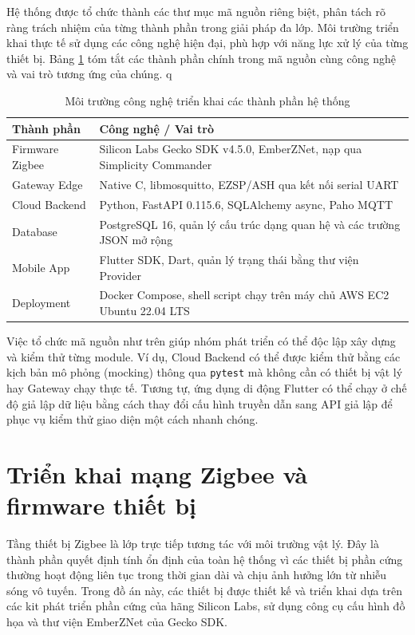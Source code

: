 Hệ thống được tổ chức thành các thư mục mã nguồn riêng biệt, phân tách rõ ràng trách nhiệm của từng thành phần trong giải pháp đa lớp. Môi trường triển khai thực tế sử dụng các công nghệ hiện đại, phù hợp với năng lực xử lý của từng thiết bị. Bảng \ref{tab:ch4-source-map} tóm tắt các thành phần chính trong mã nguồn cùng công nghệ và vai trò tương ứng của chúng.
q
\begin{table}[H]
\centering
\caption{Môi trường công nghệ triển khai các thành phần hệ thống}
\label{tab:ch4-source-map}
{\footnotesize
\begin{tabular}{|p{4.5cm}|p{10.0cm}|}
\hline
\textbf{Thành phần} & \textbf{Công nghệ / Vai trò} \\ \hline
Firmware Zigbee & Silicon Labs Gecko SDK v4.5.0, EmberZNet, nạp qua Simplicity Commander \\ \hline
Gateway Edge & Native C, libmosquitto, EZSP/ASH qua kết nối serial UART \\ \hline
Cloud Backend & Python, FastAPI 0.115.6, SQLAlchemy async, Paho MQTT \\ \hline
Database & PostgreSQL 16, quản lý cấu trúc dạng quan hệ và các trường JSON mở rộng \\ \hline
Mobile App & Flutter SDK, Dart, quản lý trạng thái bằng thư viện Provider \\ \hline
Deployment & Docker Compose, shell script chạy trên máy chủ AWS EC2 Ubuntu 22.04 LTS \\ \hline
\end{tabular}
}
\end{table}

Việc tổ chức mã nguồn như trên giúp nhóm phát triển có thể độc lập xây dựng và kiểm thử từng module. Ví dụ, Cloud Backend có thể được kiểm thử bằng các kịch bản mô phỏng (mocking) thông qua \texttt{pytest} mà không cần có thiết bị vật lý hay Gateway chạy thực tế. Tương tự, ứng dụng di động Flutter có thể chạy ở chế độ giả lập dữ liệu bằng cách thay đổi cấu hình truyền dẫn sang API giả lập để phục vụ kiểm thử giao diện một cách nhanh chóng.

\section{Triển khai mạng Zigbee và firmware thiết bị}
\label{sec:ch4-zigbee-layer}

Tầng thiết bị Zigbee là lớp trực tiếp tương tác với môi trường vật lý. Đây là thành phần quyết định tính ổn định của toàn hệ thống vì các thiết bị phần cứng thường hoạt động liên tục trong thời gian dài và chịu ảnh hưởng lớn từ nhiễu sóng vô tuyến. Trong đồ án này, các thiết bị được thiết kế và triển khai dựa trên các kit phát triển phần cứng của hãng Silicon Labs, sử dụng công cụ cấu hình đồ họa và thư viện EmberZNet của Gecko SDK.

